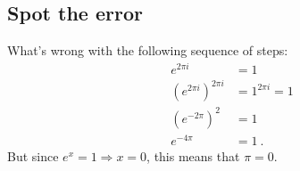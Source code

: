 \documentclass[12pt]{article}
\numberwithin{equation}{subsection}    %
\begin{document}
\subsection{Spot the error} 

What's wrong with the following sequence of steps:
\begin{align}
	e^{2\pi i} &= 1 \\
	\left(e^{2\pi i}\right)^{2\pi i} &= 1^{2\pi i} = 1 \\
	\left(e^{-2\pi}\right)^2 &= 1   \\ 
	e^{-4\pi} &= 1 \ .
\end{align}
But since $e^x =1 \Rightarrow x = 0$, this means that $\pi = 0$. 
\end{document}
